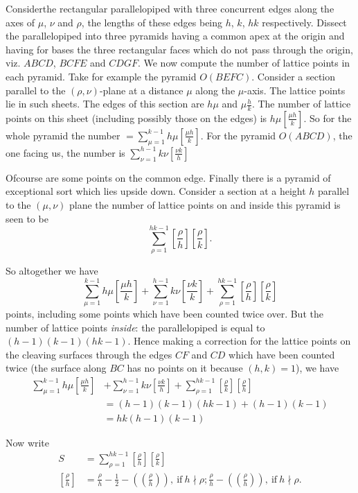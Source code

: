 Consider\pageoriginale the rectangular parallelopiped with three concurrent edges
along the axes of $\mu$, $\nu$ and $\rho$, the lengths of these edges
being $h$, $k$, $hk$ respectively. Dissect the parallelopiped into
three pyramids having a common apex at the origin and having for bases
the three rectangular faces which do not pass through the origin,
viz. $ABCD$, $BCFE$ and $CDGF$. We now compute the number of lattice
points in each pyramid. Take for example the pyramid
$O(BEFC)$. Consider a section parallel to the $(\rho, \nu)$-plane at a
distance $\mu$ along the $\mu$-axis. The lattice points lie in such
sheets. The edges of this section are $h\mu$ and $\mu
\frac{h}{k}$. The number of lattice points on this sheet (including
possibly those on the edges) is $h \mu \left[\frac{\mu h}{k}
  \right]$. So for the whole pyramid the number
$=\sum\limits^{k-1}_{\mu=1} h \mu \left[ \frac{ \mu h}{k}\right]$. For
the pyramid $O(ABCD)$, the one facing us, the number is
$\sum\limits^{h-1}_{\nu=1} k \nu \left[ \frac{\nu k}{h}\right]$ 

Of\pageoriginale course are some points on the common edge. Finally
there is a pyramid of exceptional sort which lies upside
down. Consider a section at a height $h$ parallel to the $(\mu, \nu)$
plane the number of lattice points on and inside this pyramid is seen
to be 
$$
\sum_{\rho=1}^{hk-1} \left[ \frac{\rho}{h} \right] \left[\frac{\rho}{k}
  \right]. 
$$

So altogether we have
$$
\sum^{k-1}_{\mu=1} h \mu \left[ \frac{\mu h}{k}\right]+
\sum^{h-1}_{\nu=1} k \nu \left[ \frac{\nu k}{k}\right]+
\sum^{hk-1}_{\rho=1} \left[\frac{\rho}{h} \right] \left[\frac{\rho}{k}
  \right] 
$$
points, including some points which have been counted twice over. But
the number of lattice points \textit{inside}: the parallelopiped is
equal to $(h-1)(k-1)(hk-1)$. Hence making a correction for the lattice
points on the cleaving surfaces through the edges $CF$ and $CD$ which
have been counted twice (the surface along $BC$ has no points on it
because $(h, k)=1$), we have
\begin{align*}
  \sum^{k-1}_{\mu=1} h \mu \left[\frac{\mu h}{k} \right] & +
  \sum^{h-1}_{\nu=1} k \nu \left[\frac{\nu k}{h} \right] +
  \sum^{hk-1}_{\rho=1} \left[\frac{\rho}{k}
    \right]\left[\frac{\rho}{h} \right] \\
   & =(h-1)(k-1)(hk-1)+ (h-1)(k-1)\\
   & = hk (h-1)(k-1)
\end{align*}

Now write
\begin{align*}
  S & = \sum^{hk-1}_{\rho=1} \left[\frac{\rho}{h}
    \right]\left[\frac{\rho}{k} \right]\\
  \left[\frac{\rho}{h} \right] & = \frac{\rho}{h} - \frac{1}{2} -
  \left( \left( \frac{\rho}{h}\right) \right), ~\text{if}~ h\nmid \rho;
  \frac{\rho}{h} - \left(\left( \frac{\rho}{h}\right)\right),
  ~\text{if}~ h\nmid \rho.
\end{align*}

